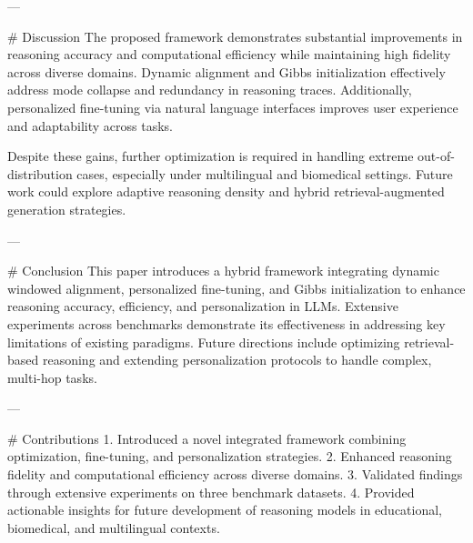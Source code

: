 ---

# Discussion  
The proposed framework demonstrates substantial improvements in reasoning accuracy and computational efficiency while maintaining high fidelity across diverse domains. Dynamic alignment and Gibbs initialization effectively address mode collapse and redundancy in reasoning traces. Additionally, personalized fine-tuning via natural language interfaces improves user experience and adaptability across tasks.  

Despite these gains, further optimization is required in handling extreme out-of-distribution cases, especially under multilingual and biomedical settings. Future work could explore adaptive reasoning density and hybrid retrieval-augmented generation strategies.

---

# Conclusion  
This paper introduces a hybrid framework integrating dynamic windowed alignment, personalized fine-tuning, and Gibbs initialization to enhance reasoning accuracy, efficiency, and personalization in LLMs. Extensive experiments across benchmarks demonstrate its effectiveness in addressing key limitations of existing paradigms. Future directions include optimizing retrieval-based reasoning and extending personalization protocols to handle complex, multi-hop tasks.

---

# Contributions  
1. Introduced a novel integrated framework combining optimization, fine-tuning, and personalization strategies.  
2. Enhanced reasoning fidelity and computational efficiency across diverse domains.  
3. Validated findings through extensive experiments on three benchmark datasets.  
4. Provided actionable insights for future development of reasoning models in educational, biomedical, and multilingual contexts.  

